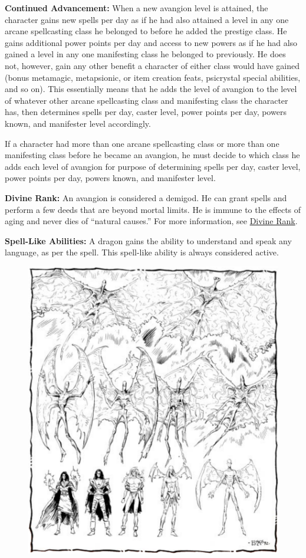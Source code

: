 {
\textbf{Continued Advancement:} When a new avangion level is attained, the character gains new spells per day as if he had also attained a level in any one arcane spellcasting class he belonged to before he added the prestige class. He gains additional power points per day and access to new powers as if he had also gained a level in any one manifesting class he belonged to previously. He does not, however, gain any other benefit a character of either class would have gained (bonus metamagic, metapsionic, or item creation feats, psicrystal special abilities, and so on). This essentially means that he adds the level of avangion to the level of whatever other arcane spellcasting class and manifesting class the character has, then determines spells per day, caster level, power points per day, powers known, and manifester level accordingly.

If a character had more than one arcane spellcasting class or more than one manifesting class before he became an avangion, he must decide to which class he adds each level of avangion for purpose of determining spells per day, caster level, power points per day, powers known, and manifester level.

\textbf{Divine Rank:} An avangion is considered a demigod. He can grant spells and perform a few deeds that are beyond mortal limits. He is immune to the effects of aging and never dies of ``natural causes.'' For more information, see \hyperref[Divine Rank]{Divine Rank}.

\textbf{Spell-Like Abilities:} A dragon gains the ability to understand and speak any language, as per the  spell. This spell-like ability is always considered active.

\begin{figure}[b!]
\centering
\includegraphics[width=\textwidth]{images/avangion-1.png}
\WOTC
\end{figure}

}
